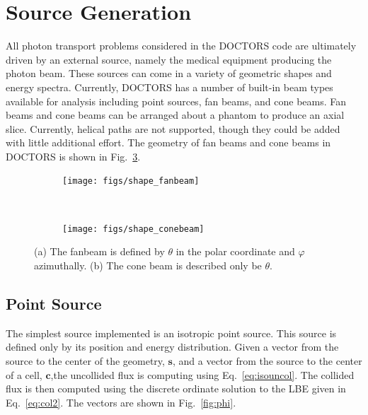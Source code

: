 
\section{Source Generation}
All photon transport problems considered in the DOCTORS code are ultimately driven by an external source, namely the medical equipment producing the photon beam. These sources can come in a variety of geometric shapes and energy spectra. Currently, DOCTORS has a number of built-in beam types available for analysis including point sources, fan beams, and cone beams. Fan beams and cone beams can be arranged about a phantom to produce an axial slice. Currently, helical paths are not supported, though they could be added with little additional effort. The geometry of fan beams and cone beams in DOCTORS is shown in Fig.~\ref{fig:shape}.

\begin{figure}
    \centering
    \begin{subfigure}[b]{.45 \textwidth}
        \texttt{[image: figs/shape\_fanbeam]}
        \caption{}
        \label{fig:shape_fanbeam}
    \end{subfigure}
    ~
    \begin{subfigure}[b]{.45 \textwidth}
        \texttt{[image: figs/shape\_conebeam]}
        \caption{}
        \label{fig:shape_conebeam}
    \end{subfigure}
    \caption{(a) The fanbeam is defined by $\theta$ in the polar coordinate and $\varphi$ azimuthally. (b) The cone beam is described only be $\theta$.}\label{fig:shape}
\end{figure}

\subsection{Point Source}
The simplest source implemented is an isotropic point source. This source is defined only by its position and energy distribution. Given a vector from the source to the center of the geometry, $\boldsymbol{s}$, and a vector from the source to the center of a cell, $\boldsymbol{c}$,the uncollided flux is computing using Eq.~\ref{eq:isouncol}. The collided flux is then computed using the discrete ordinate solution to the LBE given in Eq.~\ref{eq:col2}. The vectors are shown in Fig.~\ref{fig:phi}.

